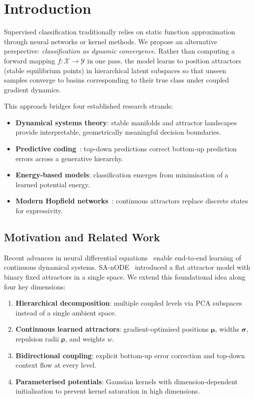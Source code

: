 \documentclass[11pt,a4paper]{article}
\begin{document}
\section{Introduction}

Supervised classification traditionally relies on static function approximation through neural
networks or kernel methods.  We propose an alternative perspective: \emph{classification as
dynamic convergence}.  Rather than computing a forward mapping $f : \mathcal{X} \to \mathcal{Y}$
in one pass, the model learns to position attractors (stable equilibrium points) in hierarchical
latent subspaces so that unseen samples converge to basins corresponding to their true class under
coupled gradient dynamics.

This approach bridges four established research strands:
\begin{itemize}
  \item \textbf{Dynamical systems theory}: stable manifolds and attractor landscapes provide
        interpretable, geometrically meaningful decision boundaries.
  \item \textbf{Predictive coding}~\cite{rao1999predictive,friston2005theory}: top-down
        predictions correct bottom-up prediction errors across a generative hierarchy.
  \item \textbf{Energy-based models}: classification emerges from minimisation of a learned
        potential energy.
  \item \textbf{Modern Hopfield networks}~\cite{ramsauer2021hopfield}: continuous attractors
        replace discrete states for expressivity.
\end{itemize}

\subsection{Motivation and Related Work}

Recent advances in neural differential equations~\cite{chen2018neural} enable end-to-end
learning of continuous dynamical systems.  SA-nODE~\cite{marino2024} introduced a flat attractor
model with binary fixed attractors in a single space.  We extend this foundational idea along four
key dimensions:
\begin{enumerate}
  \item \textbf{Hierarchical decomposition}: multiple coupled levels via PCA subspaces instead of
        a single ambient space.
  \item \textbf{Continuous learned attractors}: gradient-optimised positions $\boldsymbol{\mu}$,
        widths $\boldsymbol{\sigma}$, repulsion radii $\boldsymbol{\rho}$, and weights $w$.
  \item \textbf{Bidirectional coupling}: explicit bottom-up error correction and top-down context
        flow at every level.
  \item \textbf{Parameterised potentials}: Gaussian kernels with dimension-dependent
        initialisation to prevent kernel saturation in high dimensions.
\end{enumerate}
\end{document}
